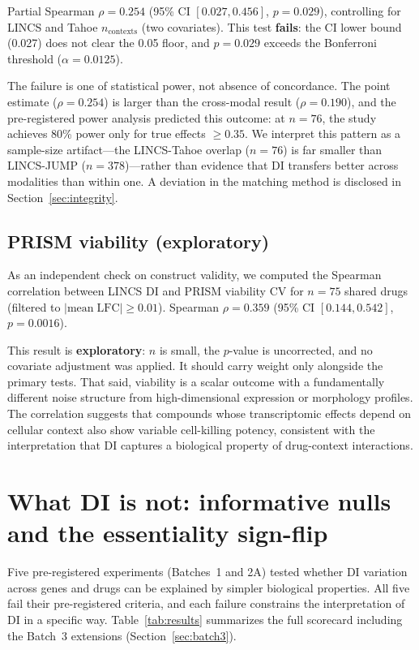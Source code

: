 \documentclass[11pt]{article}
\begin{document}
Partial Spearman $\rho = 0.254$ (95\% CI $[0.027, 0.456]$,
$p = 0.029$), controlling for LINCS and Tahoe $n_{\mathrm{contexts}}$
(two covariates).  This test \textbf{fails}: the CI lower bound
(0.027) does not clear the 0.05 floor, and $p = 0.029$ exceeds the
Bonferroni threshold ($\alpha = 0.0125$).

The failure is one of statistical power, not absence of concordance.
The point estimate ($\rho = 0.254$) is larger than the cross-modal result
($\rho = 0.190$), and the pre-registered power analysis predicted this
outcome: at $n = 76$, the study achieves 80\% power only for true
effects $\geq 0.35$.  We interpret this pattern as a sample-size
artifact---the LINCS-Tahoe overlap ($n = 76$) is far smaller than
LINCS-JUMP ($n = 378$)---rather than evidence that DI transfers better
across modalities than within one.  A deviation in the matching method
is disclosed in Section~\ref{sec:integrity}.

\subsection{PRISM viability (exploratory)}

As an independent check on construct validity, we computed the Spearman
correlation between LINCS DI and PRISM viability CV for $n = 75$ shared
drugs (filtered to $|\mathrm{mean\;LFC}| \geq 0.01$).  Spearman
$\rho = 0.359$ (95\% CI $[0.144, 0.542]$, $p = 0.0016$).

This result is \textbf{exploratory}: $n$ is small, the $p$-value is
uncorrected, and no covariate adjustment was applied.  It should carry
weight only alongside the primary tests.  That said, viability is a
scalar outcome with a fundamentally different noise structure from
high-dimensional expression or morphology profiles.  The correlation
suggests that compounds whose transcriptomic effects depend on cellular
context also show variable cell-killing potency, consistent with the
interpretation that DI captures a biological property of drug-context
interactions.


\section{What DI is not: informative nulls and the essentiality
sign-flip}
\label{sec:whatnot}

Five pre-registered experiments (Batches~1 and 2A) tested whether DI
variation across genes and drugs can be explained by simpler biological
properties.  All five fail their pre-registered criteria, and each
failure constrains the interpretation of DI in a specific way.
Table~\ref{tab:results} summarizes the full scorecard including the
Batch~3 extensions (Section~\ref{sec:batch3}).
\end{document}
